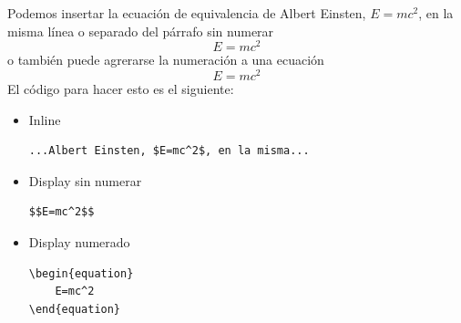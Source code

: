 \documentclass[10pt,journal,compsoc]{IEEEtran}
\begin{document}
Podemos insertar la ecuaci\'on de equivalencia de Albert Einsten, $E=mc^2$, en la misma l\'inea o separado del p\'arrafo sin numerar
$$E=mc^2$$
o tambi\'en puede agrerarse la numeraci\'on a una ecuaci\'on
\begin{equation}
	E=mc^2
\end{equation}
El c\'odigo para hacer esto es el siguiente:
\begin{itemize}
	\item Inline
\begin{lstlisting}
...Albert Einsten, $E=mc^2$, en la misma...
\end{lstlisting}
	\item Display sin numerar
\begin{lstlisting}
$$E=mc^2$$
\end{lstlisting}
	\item Display numerado
\begin{lstlisting}
\begin{equation}
	E=mc^2
\end{equation}
\end{lstlisting}
\end{itemize}
\end{document}

